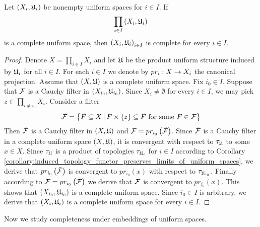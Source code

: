 \begin{theorem}\label{theorem:completeness_of_product_and_nonemptiness_of_factors_imply_their_completeness}
Let $\left(X_i,{\mathfrak U}_i\right)$ be nonempty uniform spaces for $i \in I$. If
$$\prod_{i\in I}\left(X_i,{\mathfrak U}_i\right)$$
is a complete uniform space, then $\left(X_i,{\mathfrak U}_i\right)_{i\in I}$ is complete for every $i \in I$.
\end{theorem}
\begin{proof}
Denote $X = \prod_{i\in I}X_i$ and let ${\mathfrak U}$ be the product uniform structure induced by ${\mathfrak U}_i$ for all $i\in I$. For each $i\in I$ we denote by $pr_i:X\rightarrow X_i$ the canonical projection. Assume that $(X,{\mathfrak U})$ is a complete uniform space. Fix $i_0 \in I$. Suppose that ${\mathcal F}$ is a Cauchy filter in $(X_{i_0},{\mathfrak U}_{i_0})$. Since $X_i\neq \emptyset$ for every $i\in I$, we may pick $z \in \prod_{i\neq i_0}X_i$. Consider a filter 
$$\tilde{{\mathcal F}} = \big\{\tilde{F}\subseteq X\,\big|\,F\times \{z\} \subseteq \tilde{F}\mbox{ for some }F\in {\mathcal F}\big\}$$
Then $\tilde{{\mathcal F}}$ is a Cauchy filter in $(X,{\mathfrak U})$ and ${\mathcal F} = pr_{i_0}\left(\tilde{{\mathcal F}}\right)$. Since $\tilde{{\mathcal F}}$ is a Cauchy filter in a complete uniform space $(X,{\mathfrak U})$, it is convergent with respect to $\tau_{{\mathfrak U}}$ to some $x \in X$. Since $\tau_{{\mathfrak U}}$ is a product of topologies $\tau_{{\mathfrak U}_i}$ for $i \in I$ according to Corollary \ref{corollary:induced_topology_functor_preserves_limits_of_uniform_spaces}, we derive that $pr_{i_0}\left(\tilde{{\mathcal F}}\right)$ is convergent to $pr_{i_0}(x)$ with respect to $\tau_{{\mathfrak U}_{i_0}}$. Finally according to ${\mathcal F} = pr_{i_0}\left(\tilde{{\mathcal F}}\right)$ we derive that ${\mathcal F}$ is convergent to $pr_{i_0}(x)$. This shows that $(X_{i_0},{\mathfrak U}_{i_0})$ is a complete uniform space. Since $i_0 \in I$ is arbitrary, we derive that $\left(X_i,{\mathfrak U}_i\right)$ is a complete uniform space for every $i \in I$.
\end{proof}
\noindent
Now we study completeness under embeddings of uniform spaces.

